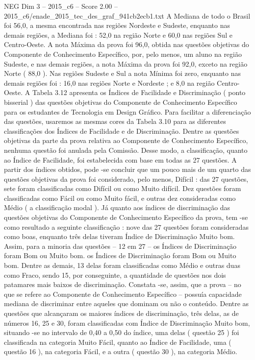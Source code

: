 \begin{textsample}{NEG Dim 3 – 2015\_c6 – Score 2.00 – 2015\_c6/enade\_2015\_tec\_des\_graf\_941cb2ecb1.txt}
A Mediana de todo o Brasil foi 56,0, a mesma encontrada nas regiões Nordeste e Sudeste, enquanto nas demais regiões, a Mediana foi : 52,0 na região Norte e 60,0 nas regiões Sul e Centro-Oeste.
A nota Máxima da prova foi 96,0, obtida nas questões objetivas do Componente de Conhecimento Específico, por, pelo menos, um aluno na região Sudeste, e nas demais regiões, a nota Máxima da prova foi 92,0, exceto na região Norte ( 88,0 ).
Nas regiões Sudeste e Sul a nota Mínima foi zero, enquanto nas demais regiões foi : 16,0 nas regiões Norte e Nordeste ; e 8,0 na região Centro-Oeste.
A Tabela 3.12 apresenta os Índices de Facilidade e Discriminação ( ponto bisserial ) das questões objetivas do Componente de Conhecimento Específico para os estudantes de Tecnologia em Design Gráfico.
Para facilitar a diferenciação das questões, usaremos as mesmas cores da Tabela 3.10 para as diferentes classificações dos Índices de Facilidade e de Discriminação.
Dentre as questões objetivas da parte da prova relativa ao Componente de Conhecimento Específico, nenhuma questão foi anulada pela Comissão.
Desse modo, a classificação, quanto ao Índice de Facilidade, foi estabelecida com base em todas as 27 questões.
A partir dos índices obtidos, pode -se concluir que um pouco mais de um quarto das questões objetivas da prova foi considerado, pelo menos, Difícil : das 27 questões, sete foram classificadas como Difícil ou como Muito difícil.
Dez questões foram classificadas como Fácil ou como Muito fácil, e outras dez consideradas como Médio ( a classificação modal ).
Já quanto aos índices de discriminação das questões objetivas do Componente de Conhecimento Específico da prova, tem -se como resultado a seguinte classificação : nove das 27 questões foram consideradas como boas, enquanto três delas tiveram Índice de Discriminação Muito bom.
Assim, para a minoria das questões – 12 em 27 – os Índices de Discriminação foram Bom ou Muito bom. os Índices de Discriminação foram Bom ou Muito bom.
Dentre as demais, 13 delas foram classificadas como Médio e outras duas como Fraco, sendo 15, por conseguinte, a quantidade de questões nos dois patamares mais baixos de discriminação.
Constata -se, assim, que a prova – no que se refere ao Componente de Conhecimento Específico – possuía capacidade mediana de discriminar entre aqueles que dominam ou não o conteúdo.
Dentre as questões que alcançaram os maiores índices de discriminação, três delas, as de números 16, 25 e 30, foram classificadas com Índice de Discriminação Muito bom, situando -se no intervalo de 0,40 a 0,50 do índice, uma delas ( questão 25 ) foi classificada na categoria Muito Fácil, quanto ao Índice de Facilidade, uma ( questão 16 ), na categoria Fácil, e a outra ( questão 30 ), na categoria Médio.

\end{textsample}
